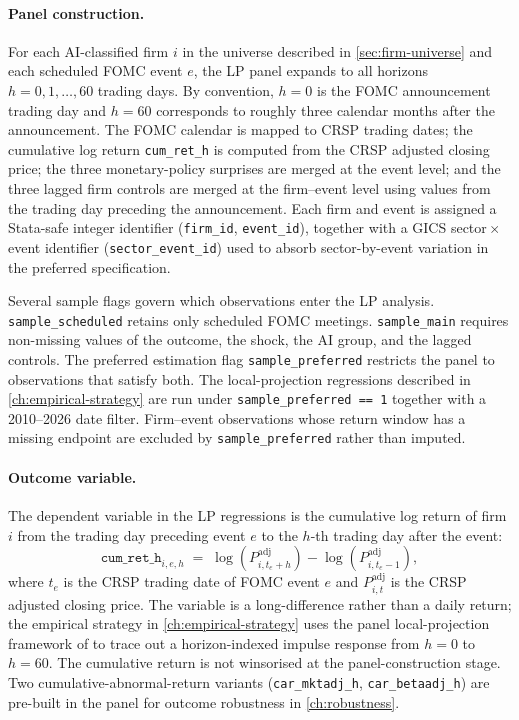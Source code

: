 \paragraph{Panel construction.} For each AI-classified firm $i$ in the universe described in \cref{sec:firm-universe} and each scheduled FOMC event $e$, the LP panel expands to all horizons $h = 0, 1, \dots, 60$ trading days. By convention, $h=0$ is the FOMC announcement trading day and $h=60$ corresponds to roughly three calendar months after the announcement. The FOMC calendar is mapped to CRSP trading dates; the cumulative log return \texttt{cum\_ret\_h} is computed from the CRSP adjusted closing price; the three monetary-policy surprises are merged at the event level; and the three lagged firm controls are merged at the firm--event level using values from the trading day preceding the announcement. Each firm and event is assigned a Stata-safe integer identifier (\texttt{firm\_id}, \texttt{event\_id}), together with a GICS sector\,$\times$\,event identifier (\texttt{sector\_event\_id}) used to absorb sector-by-event variation in the preferred specification.

Several sample flags govern which observations enter the LP analysis. \texttt{sample\_scheduled} retains only scheduled FOMC meetings. \texttt{sample\_main} requires non-missing values of the outcome, the shock, the AI group, and the lagged controls. The preferred estimation flag \texttt{sample\_preferred} restricts the panel to observations that satisfy both. The local-projection regressions described in \cref{ch:empirical-strategy} are run under \texttt{sample\_preferred == 1} together with a 2010--2026 date filter. Firm--event observations whose return window has a missing endpoint are excluded by \texttt{sample\_preferred} rather than imputed.

\paragraph{Outcome variable.} The dependent variable in the LP regressions is the cumulative log return of firm $i$ from the trading day preceding event $e$ to the $h$-th trading day after the event:
\begin{equation}
    \texttt{cum\_ret\_h}_{i,e,h} \;=\; \log\!\left(P^{\text{adj}}_{i,t_e+h}\right) - \log\!\left(P^{\text{adj}}_{i,t_e-1}\right),
    \label{eq:cum-ret}
\end{equation}
where $t_e$ is the CRSP trading date of FOMC event $e$ and $P^{\text{adj}}_{i,t}$ is the CRSP adjusted closing price. The variable is a long-difference rather than a daily return; the empirical strategy in \cref{ch:empirical-strategy} uses the panel local-projection framework of \citet{jorda2005} to trace out a horizon-indexed impulse response from $h=0$ to $h=60$. The cumulative return is not winsorised at the panel-construction stage. Two cumulative-abnormal-return variants (\texttt{car\_mktadj\_h}, \texttt{car\_betaadj\_h}) are pre-built in the panel for outcome robustness in \cref{ch:robustness}.

